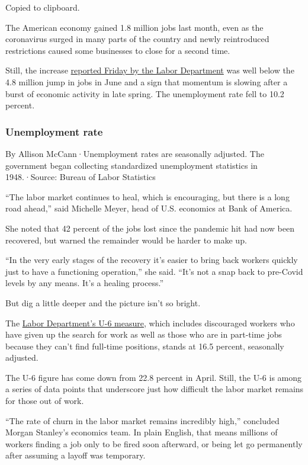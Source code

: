 Copied to clipboard.

The American economy gained 1.8 million jobs last month, even as the
coronavirus surged in many parts of the country and newly reintroduced
restrictions caused some businesses to close for a second time.

Still, the increase
\href{https://www.bls.gov/news.release/empsit.nr0.htm}{reported Friday
by the Labor Department} was well below the 4.8 million jump in jobs in
June and a sign that momentum is slowing after a burst of economic
activity in late spring. The unemployment rate fell to 10.2 percent.

\hypertarget{unemployment-rate}{%
\subsubsection{Unemployment rate}\label{unemployment-rate}}

By Allison McCann·Unemployment rates are seasonally adjusted. The
government began collecting standardized unemployment statistics in
1948.·Source: Bureau of Labor Statistics

``The labor market continues to heal, which is encouraging, but there is
a long road ahead,'' said Michelle Meyer, head of U.S. economics at Bank
of America.

She noted that 42 percent of the jobs lost since the pandemic hit had
now been recovered, but warned the remainder would be harder to make up.

``In the very early stages of the recovery it's easier to bring back
workers quickly just to have a functioning operation,'' she said. ``It's
not a snap back to pre-Covid levels by any means. It's a healing
process.''

But dig a little deeper and the picture isn't so bright.

The \href{https://www.bls.gov/news.release/empsit.t15.htm}{Labor
Department's U-6 measure}, which includes discouraged workers who have
given up the search for work as well as those who are in part-time jobs
because they can't find full-time positions, stands at 16.5 percent,
seasonally adjusted.

The U-6 figure has come down from 22.8 percent in April. Still, the U-6
is among a series of data points that underscore just how difficult the
labor market remains for those out of work.

``The rate of churn in the labor market remains incredibly high,''
concluded Morgan Stanley's economics team. In plain English, that means
millions of workers finding a job only to be fired soon afterward, or
being let go permanently after assuming a layoff was temporary.


